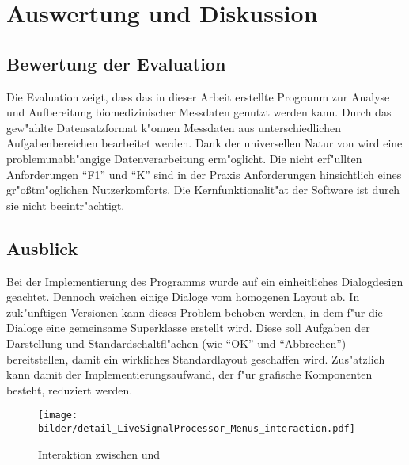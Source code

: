 \chapter{Auswertung und Diskussion}

\section{Bewertung der Evaluation}

Die Evaluation zeigt, dass das in dieser Arbeit erstellte Programm zur Analyse und Aufbereitung biomedizinischer Messdaten genutzt werden kann.
Durch das gew"ahlte Datensatzformat \us k"onnen Messdaten aus unterschiedlichen Aufgabenbereichen bearbeitet werden.
Dank der universellen Natur von \us wird eine problemunabh"angige Datenverarbeitung erm"oglicht.
Die nicht erf"ullten Anforderungen "`F1"' und "`K"' sind in der Praxis Anforderungen hinsichtlich eines gr"o{\ss}tm"oglichen Nutzerkomforts.
Die Kernfunktionalit"at der Software ist durch sie nicht beeintr"achtigt.

\section{Ausblick}

Bei der Implementierung des Programms wurde auf ein einheitliches Dialogdesign geachtet.
Dennoch weichen einige Dialoge vom homogenen Layout ab.
In zuk"unftigen Versionen kann dieses Problem behoben werden, in dem f"ur die Dialoge eine gemeinsame Superklasse erstellt wird.
Diese soll Aufgaben der Darstellung und Standardschaltfl"achen (wie "`OK"' und "`Abbrechen"') bereitstellen, damit ein wirkliches Standardlayout geschaffen wird.
Zus"atzlich kann damit der Implementierungsaufwand, der f"ur grafische Komponenten besteht, reduziert werden.

\begin{figure}[bth]
\centering
\texttt{[image: bilder/detail\_LiveSignalProcessor\_Menus\_interaction.pdf]}
\caption{Interaktion zwischen  und }
\label{pic:detail_signalprocessing}
\end{figure}

